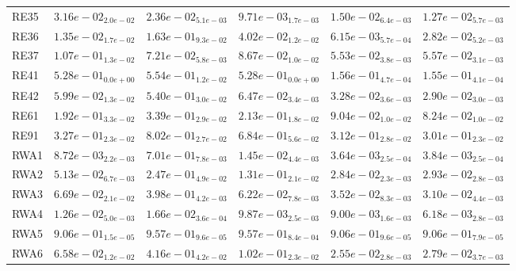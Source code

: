 \documentclass{article}
\begin{document}
\begin{table}
\begin{scriptsize}
\begin{tabular}{llllll}
RE35 & $  3.16e-02_{ 2.0e-02}$ & $  2.36e-02_{ 5.1e-03}$ & \cellcolor{gray95}$  9.71e-03_{ 1.7e-03}$ & $  1.50e-02_{ 6.4e-03}$ & \cellcolor{gray25}$  1.27e-02_{ 5.7e-03}$ \\
RE36 & \cellcolor{gray25}$  1.35e-02_{ 1.7e-02}$ & $  1.63e-01_{ 9.3e-02}$ & $  4.02e-02_{ 1.2e-02}$ & \cellcolor{gray95}$  6.15e-03_{ 5.7e-04}$ & $  2.82e-02_{ 5.2e-03}$ \\
RE37 & $  1.07e-01_{ 1.3e-02}$ & $  7.21e-02_{ 5.8e-03}$ & $  8.67e-02_{ 1.0e-02}$ & \cellcolor{gray95}$  5.53e-02_{ 3.8e-03}$ & \cellcolor{gray25}$  5.57e-02_{ 3.1e-03}$ \\
RE41 & $  5.28e-01_{ 0.0e+00}$ & $  5.54e-01_{ 1.2e-02}$ & $  5.28e-01_{ 0.0e+00}$ & \cellcolor{gray25}$  1.56e-01_{ 4.7e-04}$ & \cellcolor{gray95}$  1.55e-01_{ 4.1e-04}$ \\
RE42 & $  5.99e-02_{ 1.3e-02}$ & $  5.40e-01_{ 3.0e-02}$ & $  6.47e-02_{ 3.4e-03}$ & \cellcolor{gray25}$  3.28e-02_{ 3.6e-03}$ & \cellcolor{gray95}$  2.90e-02_{ 3.0e-03}$ \\
RE61 & $  1.92e-01_{ 3.3e-02}$ & $  3.39e-01_{ 2.9e-02}$ & $  2.13e-01_{ 1.8e-02}$ & \cellcolor{gray25}$  9.04e-02_{ 1.0e-02}$ & \cellcolor{gray95}$  8.24e-02_{ 1.0e-02}$ \\
RE91 & $  3.27e-01_{ 2.3e-02}$ & $  8.02e-01_{ 2.7e-02}$ & $  6.84e-01_{ 5.6e-02}$ & \cellcolor{gray25}$  3.12e-01_{ 2.8e-02}$ & \cellcolor{gray95}$  3.01e-01_{ 2.3e-02}$ \\
RWA1 & $  8.72e-03_{ 2.2e-03}$ & $  7.01e-01_{ 7.8e-03}$ & $  1.45e-02_{ 4.4e-03}$ & \cellcolor{gray95}$  3.64e-03_{ 2.5e-04}$ & \cellcolor{gray25}$  3.84e-03_{ 2.5e-04}$ \\
RWA2 & $  5.13e-02_{ 6.7e-03}$ & $  2.47e-01_{ 4.9e-02}$ & $  1.31e-01_{ 2.1e-02}$ & \cellcolor{gray95}$  2.84e-02_{ 2.3e-03}$ & \cellcolor{gray25}$  2.93e-02_{ 2.8e-03}$ \\
RWA3 & $  6.69e-02_{ 2.1e-02}$ & $  3.98e-01_{ 4.2e-03}$ & $  6.22e-02_{ 7.8e-03}$ & \cellcolor{gray25}$  3.52e-02_{ 8.3e-03}$ & \cellcolor{gray95}$  3.10e-02_{ 4.4e-03}$ \\
RWA4 & $  1.26e-02_{ 5.0e-03}$ & $  1.66e-02_{ 3.6e-04}$ & $  9.87e-03_{ 2.5e-03}$ & \cellcolor{gray25}$  9.00e-03_{ 1.6e-03}$ & \cellcolor{gray95}$  6.18e-03_{ 2.8e-03}$ \\
RWA5 & \cellcolor{gray95}$  9.06e-01_{ 1.5e-05}$ & $  9.57e-01_{ 9.6e-05}$ & $  9.57e-01_{ 8.4e-04}$ & $  9.06e-01_{ 9.6e-05}$ & \cellcolor{gray25}$  9.06e-01_{ 7.9e-05}$ \\
RWA6 & $  6.58e-02_{ 1.2e-02}$ & $  4.16e-01_{ 4.2e-02}$ & $  1.02e-01_{ 2.3e-02}$ & \cellcolor{gray95}$  2.55e-02_{ 2.8e-03}$ & \cellcolor{gray25}$  2.79e-02_{ 3.7e-03}$ \\

\end{tabular}
\end{scriptsize}
\end{table}
\end{document}
